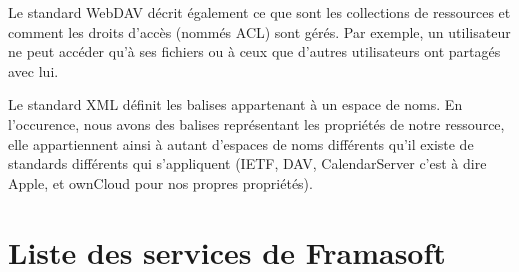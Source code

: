 \documentclass[10pt,a4paper, twoside]{report}
\begin{document}
	Le standard WebDAV décrit également ce que sont les collections de ressources et comment les droits d'accès (nommés ACL) sont gérés. Par exemple, un utilisateur ne peut accéder qu'à ses fichiers ou à ceux que d'autres utilisateurs ont partagés avec lui.
	
	Le standard XML définit les balises appartenant à un espace de noms. En l'occurence, nous avons des balises représentant les propriétés de notre ressource, elle appartiennent ainsi à autant d'espaces de noms différents qu'il existe de standards différents qui s'appliquent (IETF, DAV, CalendarServer c'est à dire Apple, et ownCloud pour nos propres propriétés).
	
	\section{Liste des services de Framasoft}
	\thispagestyle{empty}
	\label{sec:listeservices}
	
\end{document}
